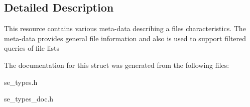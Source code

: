 \subsection{Detailed Description}
This resource contains various meta-\/data describing a file\textquotesingle{}s characteristics. The meta-\/data provides general file information and also is used to support filtered queries of file lists 

The documentation for this struct was generated from the following files\+:\begin{DoxyCompactItemize}
\item 
se\+\_\+types.\+h\item 
se\+\_\+types\+\_\+doc.\+h\end{DoxyCompactItemize}
